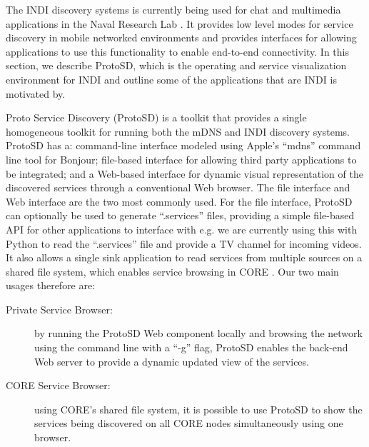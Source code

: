The INDI discovery systems is currently being used for chat and multimedia applications in the Naval Research Lab \cite{Macker2010a, Dean2011}.  It provides low level modes for service discovery in mobile networked environments and provides interfaces for allowing applications to use this functionality to enable end-to-end connectivity.  In this section, we describe ProtoSD, which is the operating and service visualization environment for INDI and outline some of the applications that are INDI is motivated by. 

Proto Service Discovery (ProtoSD) is a toolkit that provides a single homogeneous toolkit for running both the mDNS and INDI discovery systems.   ProtoSD has a: command-line interface modeled using Apple's ``mdns'' command line tool for Bonjour; file-based interface for allowing third party applications to be integrated; and a Web-based interface for dynamic visual representation of the discovered services through a conventional Web browser.   The file interface and Web interface are the two most commonly used.  For the file interface, ProtoSD can optionally be used to generate ``.services'' files,  providing a simple file-based API for other applications to interface with e.g. we are currently using this with Python to read the ``.services'' file and provide a TV channel for incoming videos.  It also allows a single sink application to read services from multiple sources on a shared file system, which enables service browsing in CORE .  Our two main usages therefore are:

\begin{description}
\item [Private Service Browser:] by running the ProtoSD Web component locally and  browsing the network using the command line with a ``-g'' flag, ProtoSD enables the back-end Web server to provide a dynamic updated view of the services.  
\item [CORE Service Browser:] using CORE's shared file system, it is possible to use ProtoSD to show the services being discovered on all CORE nodes simultaneously using one browser.
\end{description}

